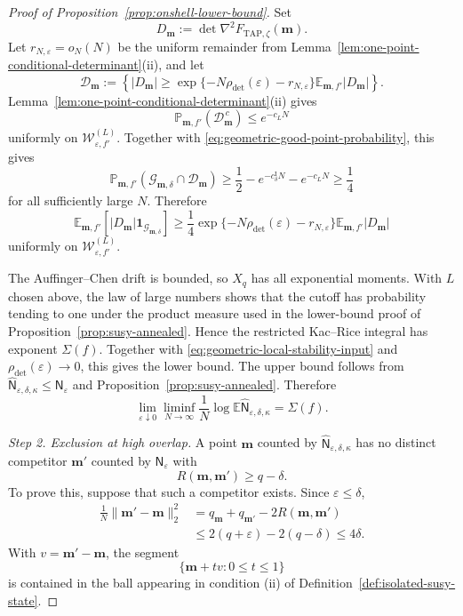 \documentclass[10pt,a4paper]{amsart}
\newcommand{\TAP}{\mathrm{TAP}}
\newcommand{\bfm}{\mathbf{m}}
\newcommand{\dE}{\mathbb{E}}%
\newcommand{\dP}{\mathbb{P}}%
\newcommand{\ve}{\varepsilon}
\begin{document}
\begin{proof}[Proof of Proposition~\ref{prop:onshell-lower-bound}]
		Set
		\[
		D_\bfm
		:=
		\det\nabla^2F_{\TAP,\zeta}(\bfm).
		\]
		Let \(r_{N,\ve}=o_N(N)\) be the uniform remainder from
		Lemma~\ref{lem:one-point-conditional-determinant}\textup{(ii)}, and let
		\[
		\mathcal D_\bfm
		:=
		\left\{
		|D_\bfm|
		\ge
		\exp\{-N\rho_{\det}(\ve)-r_{N,\ve}\}
		\dE_{\bfm,f'}|D_\bfm|
		\right\}.
		\]
		Lemma~\ref{lem:one-point-conditional-determinant}\textup{(ii)} gives
		\[
		\dP_{\bfm,f'}(\mathcal D_\bfm^{\,c})
		\le e^{-c_LN}
		\]
		uniformly on \(\mathcal W_{\ve,f'}^{(L)}\). Together with
		\eqref{eq:geometric-good-point-probability}, this gives
		\[
		\dP_{\bfm,f'}\left(
		\mathcal G_{\bfm,\delta}\cap\mathcal D_\bfm
		\right)
		\ge
		\frac12-e^{-c_\delta^{\mathrm I}N}-e^{-c_LN}
		\ge\frac14
		\]
		for all sufficiently large \(N\). Therefore
		\begin{equation}\label{eq:geometric-local-stability-input}
			\dE_{\bfm,f'}\left[
			|D_\bfm|
			\boldsymbol 1_{\mathcal G_{\bfm,\delta}}
			\right]
			\ge
			\frac14
			\exp\{-N\rho_{\det}(\ve)-r_{N,\ve}\}
			\dE_{\bfm,f'}|D_\bfm|
		\end{equation}
		uniformly on \(\mathcal W_{\ve,f'}^{(L)}\).
		
		The Auffinger--Chen drift is bounded, so \(X_q\) has all exponential
		moments. With \(L\) chosen above,
		the law of large numbers shows that the cutoff has probability tending to
		one under the product measure used in the lower-bound proof of
		Proposition~\ref{prop:susy-annealed}. Hence the restricted
		Kac--Rice integral has exponent \(\Sigma(f)\). Together with
		\eqref{eq:geometric-local-stability-input} and
		\(\rho_{\det}(\ve)\to0\), this gives the lower bound. The upper
		bound follows from
		\(\widehat{\mathsf N}_{\ve,\delta,\kappa}\le\mathsf N_\ve\) and
		Proposition~\ref{prop:susy-annealed}. Therefore
		\begin{equation}\label{eq:geometric-truncated-first-moment}
			\lim_{\ve\downarrow0}
			\liminf_{N\to\infty}
			\frac1N
			\log
			\dE\widehat{\mathsf N}_{\ve,\delta,\kappa}
			=
			\Sigma(f).
		\end{equation}
		
		\medskip\noindent\emph{Step 2. Exclusion at high overlap.}
		A point \(\bfm\) counted by
		\(\widehat{\mathsf N}_{\ve,\delta,\kappa}\) has no distinct competitor
		\(\bfm'\) counted by \(\mathsf N_\ve\) with
		\[
		R(\bfm,\bfm')\ge q-\delta.
		\]
		To prove this, suppose that such a competitor exists. Since
		\(\ve\le\delta\),
		\[
		\begin{aligned}
			\frac1N\|\bfm'-\bfm\|_2^2
			&=
			q_\bfm+q_{\bfm'}-2R(\bfm,\bfm')\\
			&\le
			2(q+\ve)-2(q-\delta)
			\le4\delta.
		\end{aligned}
		\]
		With \(v=\bfm'-\bfm\), the segment
		\[
		\{\bfm+tv:0\le t\le1\}
		\]
		is contained in the ball appearing in condition \textup{(ii)} of
		Definition~\ref{def:isolated-susy-state}.
		

\end{proof}
\end{document}
